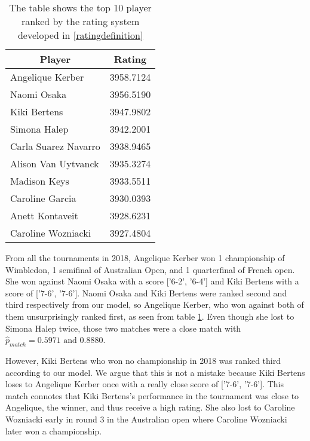 \begin{table}[h]
    \centering
    \begin{tabular}{|l|l|}
    \hline
    \multicolumn{1}{|c|}{\textbf{Player}} & \multicolumn{1}{c|}{\textbf{Rating}} \\\hline
    Angelique Kerber                      & 3958.7124       \\\hline
    Naomi Osaka                           & 3956.5190       \\\hline
    Kiki Bertens                          & 3947.9802       \\\hline
    Simona Halep                          & 3942.2001       \\\hline
    Carla Suarez Navarro                  & 3938.9465       \\\hline
    Alison Van Uytvanck                   & 3935.3274       \\\hline
    Madison Keys                          & 3933.5511       \\\hline
    Caroline Garcia                       & 3930.0393       \\\hline
    Anett Kontaveit                       & 3928.6231       \\\hline
    Caroline Wozniacki                    & 3927.4804       \\\hline
    \end{tabular}
    \caption{The table shows the top 10 player ranked by the rating system developed in \ref{ratingdefinition}}
    \label{tab:10-rating}
\end{table}

From all the tournaments in 2018, Angelique Kerber won 1 championship of Wimbledon, 1 semifinal of Australian Open, and 1 quarterfinal of French open. She won against Naomi Osaka with a score ['6-2', '6-4'] and Kiki Bertens with a score of ['7-6', '7-6']. Naomi Osaka and Kiki Bertens were ranked second and third respectively from our model, so Angelique Kerber, who won against both of them unsurprisingly ranked first, as seen from table \ref{tab:10-rating}. Even though she lost to Simona Halep twice, those two matches were a close match with $\hat p_{match} = 0.5971 \text{ and } 0.8880$. %

However, Kiki Bertens who won no championship in 2018 was ranked third according to our model. We argue that this is not a mistake because Kiki Bertens loses to Angelique Kerber once with a really close score of ['7-6', '7-6']. This match connotes that Kiki Bertens's performance in the tournament was close to Angelique, the winner, and thus receive a high rating. She also lost to Caroline Wozniacki early in round 3 in the Australian open where Caroline Wozniacki later won a championship. %

